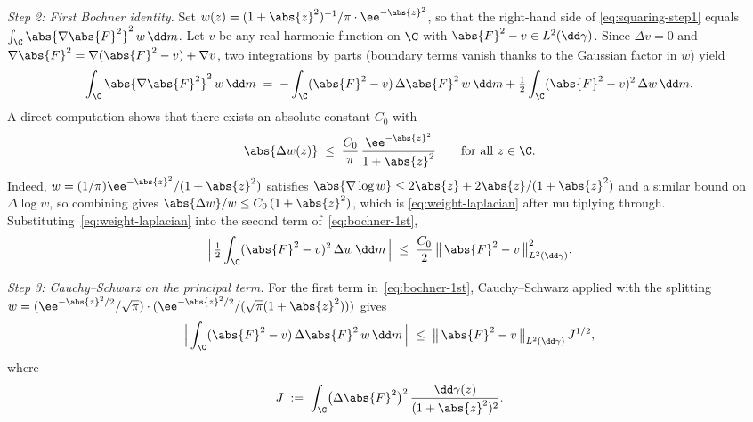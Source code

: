 \medskip
\noindent\emph{Step 2: First Bochner identity.}\;
Set $w(z) = (1+\abs{z}^2)^{-1}/\pi \cdot \ee^{-\abs{z}^2}$, so that the
right-hand side of \eqref{eq:squaring-step1} equals
$\int_{\C}\abs{\nabla\abs{F}^2}^2\, w\,\dd m$. Let $v$ be any real
harmonic function on $\C$ with $\abs{F}^2 - v \in L^2(\dd\gamma)$. Since
$\Delta v = 0$ and $\nabla \abs{F}^2 = \nabla(\abs{F}^2 - v) + \nabla v$,
two integrations by parts (boundary terms vanish thanks to the Gaussian
factor in $w$) yield
\begin{equation}\label{eq:bochner-1st}
\int_{\C} \abs{\nabla \abs{F}^2}^2\, w\, \dd m
\;=\;
-\int_{\C} (\abs{F}^2 - v)\, \Delta\abs{F}^2\, w\, \dd m
+ \tfrac{1}{2} \int_{\C} (\abs{F}^2 - v)^2\, \Delta w\, \dd m.
\end{equation}
A direct computation shows that there exists an absolute constant $C_0$
with
\begin{equation}\label{eq:weight-laplacian}
\abs{\Delta w(z)}
\;\le\;
\frac{C_0}{\pi}\, \frac{\ee^{-\abs{z}^2}}{1+\abs{z}^2}
\qquad\text{for all } z \in \C.
\end{equation}
Indeed, $w = (1/\pi)\ee^{-\abs{z}^2}/(1+\abs{z}^2)$ satisfies
$\abs{\nabla \log w} \le 2\abs{z} + 2\abs{z}/(1+\abs{z}^2)$ and a similar
bound on $\Delta\log w$, so combining gives
$\abs{\Delta w}/w \le C_0\,(1 + \abs{z}^2)$, which is
\eqref{eq:weight-laplacian} after multiplying through.
Substituting~\eqref{eq:weight-laplacian} into the second term
of~\eqref{eq:bochner-1st},
\begin{equation}\label{eq:bochner-1st-2nd-term}
\Bigl|\, \tfrac{1}{2}\int_{\C} (\abs{F}^2 - v)^2\, \Delta w\, \dd m \,\Bigr|
\;\le\;
\frac{C_0}{2}\, \bigl\|\, \abs{F}^2 - v \,\bigr\|_{L^2(\dd\gamma)}^2.
\end{equation}

\medskip
\noindent\emph{Step 3: Cauchy--Schwarz on the principal term.}\;
For the first term in~\eqref{eq:bochner-1st}, Cauchy--Schwarz applied
with the splitting $w = (\ee^{-\abs{z}^2/2}/\sqrt{\pi}) \cdot
(\ee^{-\abs{z}^2/2}/(\sqrt{\pi}(1+\abs{z}^2)))$ gives
\begin{equation}\label{eq:bochner-CS}
\Bigl|\,\int_{\C} (\abs{F}^2-v)\, \Delta\abs{F}^2\, w\, \dd m \,\Bigr|
\;\le\;
\bigl\|\,\abs{F}^2 - v\,\bigr\|_{L^2(\dd\gamma)}\, J^{1/2},
\end{equation}
where
\begin{equation}\label{eq:J-def}
J \;:=\; \int_{\C} \bigl(\Delta\abs{F}^2\bigr)^2\,
\frac{\dd\gamma(z)}{(1+\abs{z}^2)^2}.
\end{equation}

